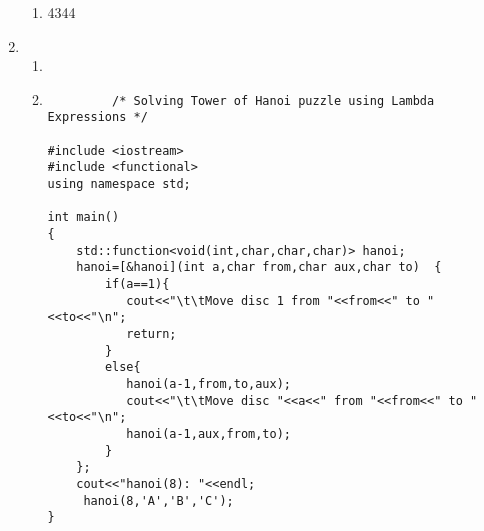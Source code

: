 \documentclass[11pt]{article}
\begin{document}
\begin{enumerate}
\begin{enumerate}
\item 4344
\end{enumerate}
\item
\begin{enumerate}
     \item 
     \item \begin{lstlisting}
         /* Solving Tower of Hanoi puzzle using Lambda Expressions */

#include <iostream>
#include <functional>
using namespace std;

int main()
{
    std::function<void(int,char,char,char)> hanoi;
    hanoi=[&hanoi](int a,char from,char aux,char to)  {
        if(a==1){
           cout<<"\t\tMove disc 1 from "<<from<<" to "<<to<<"\n";
           return;
        }
        else{
           hanoi(a-1,from,to,aux);
           cout<<"\t\tMove disc "<<a<<" from "<<from<<" to "<<to<<"\n";
           hanoi(a-1,aux,from,to);
        }
    };
    cout<<"hanoi(8): "<<endl;
     hanoi(8,'A','B','C');
}
     \end{lstlisting}
 \end{enumerate}
\end{enumerate}
\end{document}
